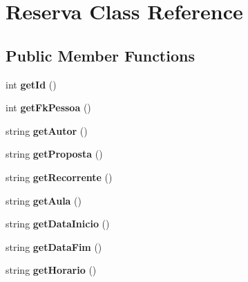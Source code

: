 \hypertarget{classReserva}{}\section{Reserva Class Reference}
\label{classReserva}
\subsection*{Public Member Functions}
\begin{DoxyCompactItemize}
\item 
int {\bfseries get\+Id} ()\hypertarget{classReserva_a6e90071312a47a673eb9736bcc67ba7f}{}\label{classReserva_a6e90071312a47a673eb9736bcc67ba7f}

\item 
int {\bfseries get\+Fk\+Pessoa} ()\hypertarget{classReserva_ad6d72c1760ec4dc706314b130219c89f}{}\label{classReserva_ad6d72c1760ec4dc706314b130219c89f}

\item 
string {\bfseries get\+Autor} ()\hypertarget{classReserva_a54f140654be883031b7fd8160f68a35c}{}\label{classReserva_a54f140654be883031b7fd8160f68a35c}

\item 
string {\bfseries get\+Proposta} ()\hypertarget{classReserva_ab23536cc59e32abb7d0fda451c0f52d7}{}\label{classReserva_ab23536cc59e32abb7d0fda451c0f52d7}

\item 
string {\bfseries get\+Recorrente} ()\hypertarget{classReserva_ab26299673227e608110f6e536d630473}{}\label{classReserva_ab26299673227e608110f6e536d630473}

\item 
string {\bfseries get\+Aula} ()\hypertarget{classReserva_a1eccd1a6a33e6e5e01c1a4a28081fa98}{}\label{classReserva_a1eccd1a6a33e6e5e01c1a4a28081fa98}

\item 
string {\bfseries get\+Data\+Inicio} ()\hypertarget{classReserva_a8be3d70c1a595d24d554bfaab7257dfc}{}\label{classReserva_a8be3d70c1a595d24d554bfaab7257dfc}

\item 
string {\bfseries get\+Data\+Fim} ()\hypertarget{classReserva_a7a982974a389be9f8868c69c570054b9}{}\label{classReserva_a7a982974a389be9f8868c69c570054b9}

\item 
string {\bfseries get\+Horario} ()\hypertarget{classReserva_a907b1b157f4b06a624577758cdc7b58e}{}\label{classReserva_a907b1b157f4b06a624577758cdc7b58e}


\end{DoxyCompactItemize}
